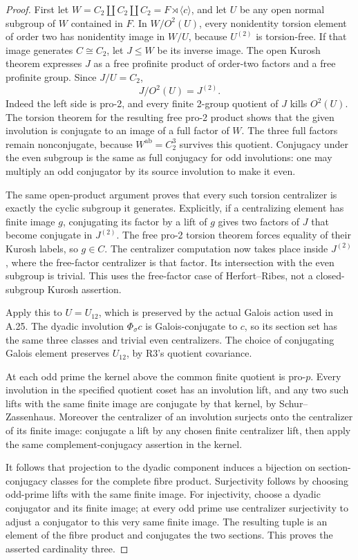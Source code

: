 \begin{proof}
First let
\(W=C_2\amalg C_2\amalg C_2=F\rtimes\langle c\rangle\),
and let \(U\) be any open normal subgroup of
\(W\) contained in \(F\). In
\(W/O^2(U)\), every nonidentity torsion element
of order two has nonidentity image in \(W/U\),
because \(U^{(2)}\) is torsion-free. If that
image generates \(C\cong C_2\), let
\(J\leq W\) be its inverse image. The open
Kurosh theorem expresses \(J\) as a free
profinite product of order-two factors and a
free profinite group. Since \(J/U=C_2\),
\[
                     J/O^2(U)=J^{(2)}.
\]
Indeed the left side is pro-2, and every finite
2-group quotient of \(J\) kills \(O^2(U)\).
The torsion theorem for the resulting free pro-2
product shows that the given involution is conjugate
to an image of a full factor of \(W\).
The three full factors remain nonconjugate,
because \(W^{\mathrm{ab}}=C_2^3\) survives this
quotient. Conjugacy under the even subgroup
is the same as full conjugacy for odd involutions:
one may multiply an odd conjugator by its
source involution to make it even.

The same open-product argument proves that every
such torsion centralizer is exactly the cyclic
subgroup it generates. Explicitly, if a centralizing
element has finite image \(g\), conjugating its
factor by a lift of \(g\) gives two factors of
\(J\) that become conjugate in \(J^{(2)}\).
The free pro-2 torsion theorem forces equality
of their Kurosh labels, so \(g\in C\).
The centralizer computation now takes place inside
\(J^{(2)}\), where the free-factor centralizer
is that factor. Its intersection with the even
subgroup is trivial. This uses the free-factor
case of Herfort--Ribes, not a closed-subgroup
Kurosh assertion.\cite{A_HR1985}

Apply this to \(U=U_{12}\), which is preserved
by the actual Galois action used in A.25.
The dyadic involution \(\Phi_\sigma c\) is
Galois-conjugate to \(c\), so its section set
has the same three classes and trivial even
centralizers. The choice of conjugating Galois
element preserves \(U_{12}\), by R3's quotient
covariance.

At each odd prime the kernel above the common
finite quotient is pro-\(p\). Every involution
in the specified quotient coset has an involution
lift, and any two such lifts with the same finite
image are conjugate by that kernel, by
Schur--Zassenhaus. Moreover the centralizer of
an involution surjects onto the centralizer of
its finite image: conjugate a lift by any chosen
finite centralizer lift, then apply the same
complement-conjugacy assertion in the kernel.

It follows that projection to the dyadic component
induces a bijection on section-conjugacy classes
for the complete fibre product. Surjectivity
follows by choosing odd-prime lifts with the
same finite image. For injectivity, choose a
dyadic conjugator and its finite image; at every
odd prime use centralizer surjectivity to adjust
a conjugator to this very same finite image.
The resulting tuple is an element of the fibre
product and conjugates the two sections. This
proves the asserted cardinality three.
\end{proof}

